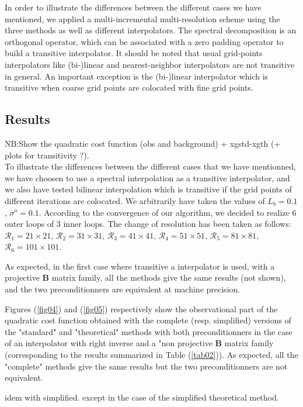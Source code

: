 \documentclass[npg, manuscript]{copernicus}
\begin{document}
In order to illustrate the differences between the different cases we have mentioned, we applied a multi-incremental multi-resolution scheme using the three methods as well as different interpolators. The spectral decomposition is an orthogonal operator, which can be associated with a zero padding operator to build a transitive interpolator. It should be noted that usual grid-points interpolators like (bi-)linear and nearest-neighbor interpolators are not transitive in general. An important exception is the (bi-)linear interpolator which is transitive when coarse grid points are colocated with fine grid points.

\subsection{Results}
NB:Show the quadratic cost function (obs and background) + xgstd-xgth (+ plots for transitivity ?).\\

To illustrate the differences between the different cases that we have mentionned, we have choosen to use a spectral interpolation as a transitive interpolator, and we also have tested bilinear interpolation which is transitive if the grid points of different iterations are colocated. We arbitrarily have taken the values of $L_b = 0.1$, $\sigma^o=0.1$. According to the convergence of our algorithm, we decided to realize 6 outer loops of 3 inner loops. The change of resolution has been taken as follows: $\mathcal{R}_1 = 21 \times 21$, $\mathcal{R}_2 = 31 \times 31$, $\mathcal{R}_3 = 41 \times 41$, $\mathcal{R}_4 = 51 \times 51$, $\mathcal{R}_5 = 81 \times 81$, $\mathcal{R}_6 = 101 \times 101$.

As expected, in the first case where transitive a interpolator is used, with a projective $\mathbf{B}$ matrix family, all the methods give the same results (not shown), and the two preconditionners are equivalent at machine precision.

Figures (\ref{fig04}) and (\ref{fig05}) respectively show the observational part of the quadratic cost function obtained with the complete (resp. simplified) versions of the "standard" and "theoretical" methods with both preconditionners in the case of an interpolator with right inverse and a "non projective $\mathbf{B}$ matrix family (corresponding to the results summarized in Table (\ref{tab02})). As expected, all the "complete" methods give the same results but the two preconditionners are not equivalent.

idem with simplified.
except in the case of the simplified theoretical method.
\end{document}
